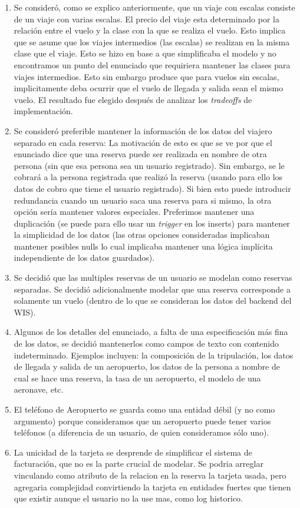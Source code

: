 \begin{enumerate}
	\item Se consider\'o, como se explico anteriormente, que un viaje con escalas consiste de un viaje con varias escalas. El
	precio del viaje esta determinado por la relaci\'on entre el vuelo y la clase con la que se realiza el vuelo. Esto implica
	que se asume que los viajes intermedios (las escalas) se realizan en la misma clase que el viaje. Esto se hizo en base a que
	simplificaba el modelo y no encontramos un punto del enunciado que requiriera mantener las clases para viajes intermedios.
	Esto sin embargo produce que para vuelos sin escalas, implicitamente deba ocurrir que el vuelo de llegada y salida sean el
	mismo vuelo. El resultado fue elegido despu\'es de analizar los \textit{tradeoffs} de implementaci\'on.
	\item Se consider\'o preferible mantener la informaci\'on de los datos del viajero separado en cada reserva: La motivaci\'on
	de esto es que se ve por que el enunciado dice que una reserva puede ser realizada en nombre de otra persona (sin que esa
	persona sea un usuario registrado). Sin embargo, se le cobrar\'a a la persona registrada que realiz\'o la reserva (usando
	para ello los datos de cobro que tiene el usuario registrado). Si bien esto puede introducir redundancia cuando un usuario
	saca una reserva para si mismo, la otra opci\'on ser\'ia mantener valores especiales. Preferimos mantener una duplicaci\'on
	(se puede para ello usar un \textit{trigger} en los inserts) para mantener la simplicidad de los datos (las otras opciones
	consideradas implicaban mantener posibles nulls lo cual implicaba mantener una l\'ogica impl\'icita independiente de los
	datos guardados).
	\item Se decidi\'o que las multiples reservas de un usuario se modelan como reservas separadas. Se decidi\'o adicionalmente
	modelar que una reserva corresponde a solamente un vuelo (dentro de lo que se consideran los datos del backend del WIS).
	\item Algunos de los detalles del enunciado, a falta de una especificaci\'on m\'as fina de los datos, se decidi\'o mantenerlos
	como campos de texto con contenido indeterminado. Ejemplos incluyen: la composici\'on de la tripulaci\'on, los datos de llegada
	y salida de un aeropuerto, los datos de la persona a nombre de cual se hace una reserva, la tasa de un aeropuerto, el modelo
	de una aeronave, etc.
	\item El tel\'efono de Aeropuerto se guarda como una entidad d\'ebil (y no como argumento) porque consideramos 
	que un aeropuerto puede tener varios tel\'efonos (a diferencia de un usuario, de quien consideramos s\'olo uno).
    \item La unicidad de la tarjeta se desprende de simplificar el sistema de facturaci\'on, que no es la parte crucial de
    modelar. Se podria arreglar vinculando como atributo de la relacion en la reserva la tarjeta usada, pero
    agregaria complejidad convirtiendo la tarjeta en entidades fuertes que tienen que existir aunque el usuario no la use mas,
    como log historico.
\end{enumerate}
